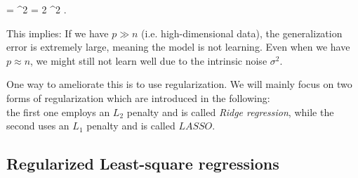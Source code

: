 \be 
{} = \sigma^2 = 2 \sigma^2 .
\ee 
\begin{mybox}{}
	This implies: If we have $p\gg n$ (i.e. high-dimensional data), the generalization error is extremely large, meaning the model is not learning. Even when we have $p\approx n$, we might still not learn well due to the intrinsic noise $\sigma^2$.
\end{mybox}
One way to ameliorate this is to use regularization. We will mainly focus on two forms of regularization which are introduced in the following:\\
the first one employs an $L_2$ penalty and is called \emph{Ridge regression}, while the second uses an $L_1$ penalty and is called $LASSO$.
\subsection{Regularized Least-square regressions}

